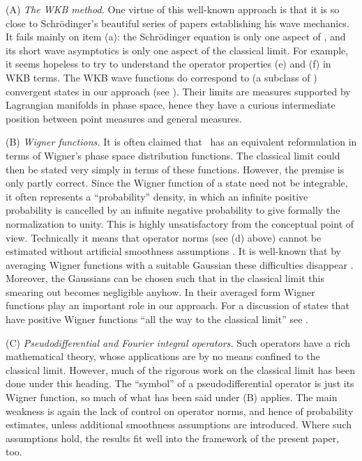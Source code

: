 \item{(A)}
{\it The WKB method.}
\cite{Maslov,Schiff,Helffer,Froman,Duclos,BurdHJ}
One virtue of this well-known approach is that it is so
close to Schr\"odinger's beautiful series of papers establishing his
wave mechanics. It fails mainly on item (a): the Schr\"odinger
equation is only one aspect of \QM, and its short wave asymptotics is
only one aspect of the classical limit. For example, it seems hopeless
to try to understand the operator properties (e) and (f) in WKB terms.
The WKB wave functions do correspond to (a subclass of ) convergent
states in our approach (see ). Their limits are measures
supported by Lagrangian manifolds in phase space, hence they have a
curious intermediate position between point measures and general
measures.

\item{(B)} {\it Wigner functions.}
\cite{Wigner,Berry,Bruer,Sirugue,Arai}
It is often claimed that \QM\ has an equivalent reformulation in
terms of Wigner's phase space distribution functions. The classical
limit could then be stated very simply in terms of these functions.
However, the premise is only partly correct. Since the Wigner
function of a state need not be integrable, it often represents a
``probability'' density, in which an infinite positive probability
is cancelled by an infinite negative probability to give formally
the normalization to unity. This is highly unsatisfactory from the
conceptual point of view. Technically it means that operator norms
(see (d) above) cannot be estimated without artificial smoothness
assumptions \cite{Daubechies}. It is well-known that by averaging
Wigner functions with a suitable Gaussian \cite{Bopp,Cartwright}
these difficulties disappear \cite{Davies,Holevo,QHA}. Moreover, the
Gaussians can be chosen such that in the classical limit this
smearing out becomes negligible anyhow. In their averaged form
Wigner functions play an important role in our approach. For a
discussion of states that have positive Wigner functions ``all the
way to the classical limit'' see .


\item{(C)} {\it Pseudodifferential and Fourier integral operators.}
\cite{Robert,Voros,Omnes}
Such operators have a rich mathematical theory, whose applications
are by no means confined to the classical limit. However, much of
the rigorous work on the classical limit has been done under this
heading. The ``symbol'' of a pseudodifferential operator is just its
Wigner function, so much of what has been said under (B) applies.
The main weakness is again the lack of control on operator norms,
and hence of probability estimates, unless additional smoothness
assumptions are introduced. Where such assumptions hold, the results
fit well into the framework of the present paper, too.

